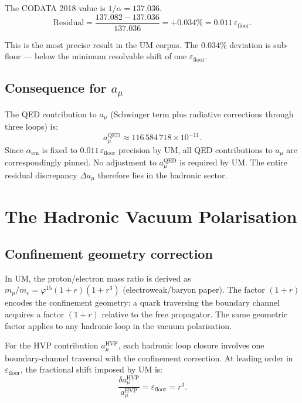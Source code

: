 \documentclass[12pt]{article}
\begin{document}
The CODATA 2018 value is $1/\alpha = 137.036$.
\begin{equation}
  \text{Residual} = \frac{137.082 - 137.036}{137.036}
  = +0.034\% = 0.011\,\varepsilon_{\text{floor}}.
  \label{eq:alpha_resid}
\end{equation}

This is the most precise result in the UM corpus. The $0.034\%$
deviation is sub-floor --- below the minimum resolvable shift of one
$\varepsilon_{\text{floor}}$.

\subsection{Consequence for $a_\mu$}

The QED contribution to $a_\mu$ (Schwinger term plus radiative
corrections through three loops) is:
\begin{equation}
  a_\mu^{\text{QED}} \approx 116\,584\,718 \times 10^{-11}.
\end{equation}
Since $\alpha_{\text{em}}$ is fixed to $0.011\,\varepsilon_{\text{floor}}$
precision by UM, all QED contributions to $a_\mu$ are correspondingly
pinned. No adjustment to $a_\mu^{\text{QED}}$ is required by UM. The
entire residual discrepancy $\Delta a_\mu$ therefore lies in the hadronic
sector.

\section{The Hadronic Vacuum Polarisation}

\subsection{Confinement geometry correction}

In UM, the proton/electron mass ratio is derived as
$m_p/m_e = \varphi^{15}(1+r)(1+r^3)$ (electroweak/baryon paper). The
factor $(1+r)$ encodes the confinement geometry: a quark traversing
the boundary channel acquires a factor $(1+r)$ relative to the free
propagator. The same geometric factor applies to any hadronic loop in
the vacuum polarisation.

For the HVP contribution $a_\mu^{\text{HVP}}$, each hadronic loop
closure involves one boundary-channel traversal with the confinement
correction. At leading order in $\varepsilon_{\text{floor}}$, the
fractional shift imposed by UM is:
\begin{equation}
  \frac{\delta a_\mu^{\text{HVP}}}{a_\mu^{\text{HVP}}}
  = \varepsilon_{\text{floor}} = r^3.
  \label{eq:hvp_shift}
\end{equation}
\end{document}
